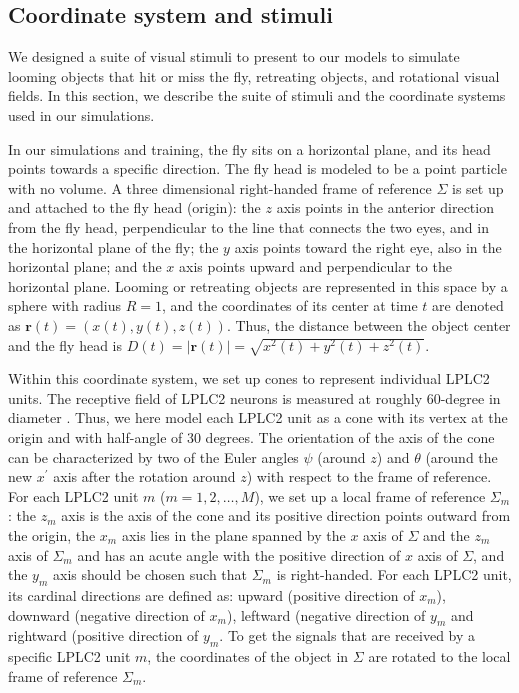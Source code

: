 \documentclass[pdftex,9pt,lineno]{elife}
\begin{document}
\subsection{Coordinate system and stimuli}
We designed a suite of visual stimuli to present to our models to simulate looming objects that hit or miss the fly, retreating objects, and rotational visual fields. In this section, we describe the suite of stimuli and the coordinate systems used in our simulations.

In our simulations and training, the fly sits on a horizontal plane, and its head points towards a specific direction. The fly head is modeled to be a point particle with no volume. A three dimensional right-handed frame of reference $\Sigma$ is set up and attached to the fly head (origin): the $z$ axis points in the anterior direction from the fly head, perpendicular to the line that connects the two eyes, and in the horizontal plane of the fly; the $y$ axis points toward the right eye, also in the horizontal plane; and the $x$ axis points upward and perpendicular to the horizontal plane. Looming or retreating objects are represented in this space by a sphere with radius $R=1$, and the coordinates of its center at time $t$ are denoted as $\mathbf{r}(t) = (x(t),y(t),z(t))$. Thus, the distance between the object center and the fly head is $D(t) = |\mathbf{r}(t)| = \sqrt{x^{2}(t)+y^{2}(t)+z^{2}(t)}$.

Within this coordinate system, we set up cones to represent individual LPLC2 units. The receptive field of LPLC2 neurons is measured at roughly 60-degree in diameter \citep{klapoetke2017ultra}. Thus, we here model each LPLC2 unit as a cone with its vertex at the origin and with half-angle of 30 degrees. The orientation of the axis of the cone can be characterized by two of the Euler angles $\psi$ (around $z$) and $\theta$ (around the new $x^{'}$ axis after the rotation around $z$) with respect to the frame of reference. For each LPLC2 unit $m$ ($m=1, 2, \dots, M$), we set up a local frame of reference $\Sigma_{m}$: the $z_{m}$ axis is the axis of the cone and its positive direction points outward from the origin, the $x_{m}$ axis lies in the plane spanned by the $x$ axis of $\Sigma$ and the $z_{m}$ axis of $\Sigma_{m}$ and has an acute angle with the positive direction of $x$ axis of $\Sigma$, and the $y_{m}$ axis should be chosen such that $\Sigma_{m}$ is right-handed. For each LPLC2 unit, its cardinal directions are defined as: upward (positive direction of $x_{m}$), downward (negative direction of $x_{m}$), leftward (negative direction of $y_{m}$ and rightward (positive direction of $y_{m}$. To get the signals that are received by a specific LPLC2 unit $m$, the coordinates of the object in $\Sigma$ are rotated to the local frame of reference $\Sigma_{m}$.
\end{document}
